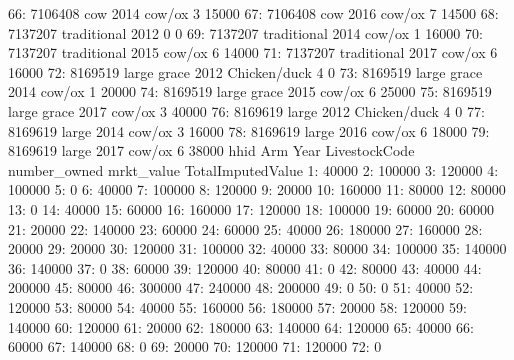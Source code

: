 \begin{Schunk}
\begin{Soutput}
66: 7106408         cow 2014        cow/ox            3      15000
67: 7106408         cow 2016        cow/ox            7      14500
68: 7137207 traditional 2012                          0          0
69: 7137207 traditional 2014        cow/ox            1      16000
70: 7137207 traditional 2015        cow/ox            6      14000
71: 7137207 traditional 2017        cow/ox            6      16000
72: 8169519 large grace 2012  Chicken/duck            4          0
73: 8169519 large grace 2014        cow/ox            1      20000
74: 8169519 large grace 2015        cow/ox            6      25000
75: 8169519 large grace 2017        cow/ox            3      40000
76: 8169619       large 2012  Chicken/duck            4          0
77: 8169619       large 2014        cow/ox            3      16000
78: 8169619       large 2016        cow/ox            6      18000
79: 8169619       large 2017        cow/ox            6      38000
       hhid         Arm Year LivestockCode number_owned mrkt_value
    TotalImputedValue
 1:             40000
 2:            100000
 3:            120000
 4:            100000
 5:                 0
 6:             40000
 7:            100000
 8:            120000
 9:             20000
10:            160000
11:             80000
12:             80000
13:                 0
14:             40000
15:             60000
16:            160000
17:            120000
18:            100000
19:             60000
20:             60000
21:             20000
22:            140000
23:             60000
24:             60000
25:             40000
26:            180000
27:            160000
28:             20000
29:             20000
30:            120000
31:            100000
32:             40000
33:             80000
34:            100000
35:            140000
36:            140000
37:                 0
38:             60000
39:            120000
40:             80000
41:                 0
42:             80000
43:             40000
44:            200000
45:             80000
46:            300000
47:            240000
48:            200000
49:                 0
50:                 0
51:             40000
52:            120000
53:             80000
54:             40000
55:            160000
56:            180000
57:             20000
58:            120000
59:            140000
60:            120000
61:             20000
62:            180000
63:            140000
64:            120000
65:             40000
66:             60000
67:            140000
68:                 0
69:             20000
70:            120000
71:            120000
72:                 0

\end{Soutput}
\end{Schunk}
